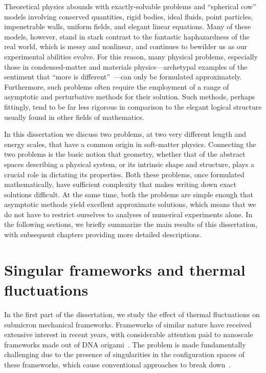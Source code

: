 Theoretical physics abounds with exactly-solvable problems and ``spherical cow'' models involving conserved quantities, rigid bodies, ideal fluids, point particles, impenetrable walls, uniform fields, and elegant linear equations.
Many of these models, however, stand in stark contrast to the fantastic haphazardness of the real world, which is messy and nonlinear, and continues to bewilder us as our experimental abilities evolve.
For this reason, many physical problems, especially those in condensed-matter and materials physics---archetypal examples of the sentiment that ``more is different''~\cite{anderson1972}---can only be formulated approximately.
Furthermore, such problems often require the employment of a range of asymptotic and perturbative methods for their solution.
Such methods, perhaps fittingly, tend to be far less rigorous in comparison to the elegant logical structure usually found in other fields of mathematics.

In this dissertation we discuss two problems, at two very different length and energy scales, that have a common origin in soft-matter physics.
Connecting the two problems is the basic notion that geometry, whether that of the abstract spaces describing a physical system, or its intrinsic shape and structure, plays a crucial role in dictating its properties.
Both these problems, once formulated mathematically, have sufficient complexity that makes writing down exact solutions difficult.
At the same time, both the problems are simple enough that asymptotic methods yield excellent approximate solutions, which means that we do not have to restrict ourselves to analyses of numerical experiments alone.
In the following sections, we briefly summarize the main results of this dissertation, with subsequent chapters providing more detailed descriptions.

\section{Singular frameworks and thermal fluctuations}

In the first part of the dissertation, we study the effect of thermal fluctuations on submicron mechanical frameworks.
Frameworks of similar nature have received extensive interest in recent years, with considerable attention paid to nanoscale frameworks made out of DNA origami~\cite{dunn2015,matthies2016}.
The problem is made fundamentally challenging due to the presence of singularities in the configuration spaces of these frameworks, which cause conventional approaches to break down~\cite{mannattil2022}.

